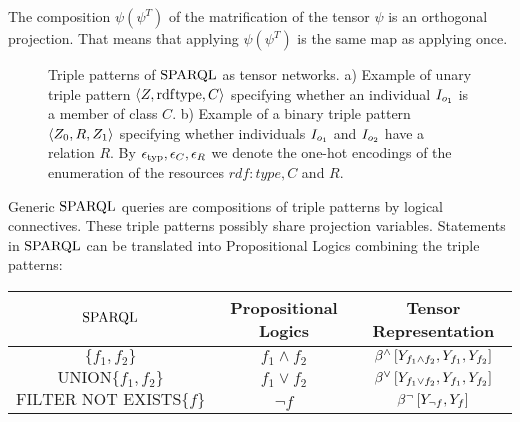 The composition $\psi (\psi^T)$ of the matrification of the tensor $\psi$ is an orthogonal projection.
That means that applying $\psi (\psi^T)$ is the same map as applying once.


\begin{figure}[h]
    \begin{center}
        
    \end{center}
    \caption{Triple patterns of $\mathrm{SPARQL}$ as tensor networks.
    a) Example of unary triple pattern $\braket{Z,\mathrm{rdf}\mathrm{type},C}$ specifying whether an individual $I_{o_{1}}$ is a member of class $C$.
        b) Example of a binary triple pattern $\braket{Z_{0},R,Z_{1}}$ specifying whether individuals $I_{o_{1}}$ and $I_{o_{2}}$ have a relation $R$.
        By $\epsilon_{\mathrm{typ}},\epsilon_{C},\epsilon_{R}$ we denote the one-hot encodings of the enumeration of the resources $rdf:type, C$ and $R$.
    }
    \label{fig:triplePatterns}
\end{figure}





Generic $\mathrm{SPARQL}$ queries are compositions of triple patterns by logical connectives. %
These triple patterns possibly share projection variables.
Statements in $\mathrm{SPARQL}$ can be translated into Propositional Logics combining the triple patterns:
\begin{center}
    \begin{tabular}{|c|c|c|}
        \hline
        \textbf{$\mathrm{SPARQL}$}                & \textbf{Propositional Logics} & \textbf{Tensor Representation}                                                                   \\
        \hline
        $\{f_1, f_2\}$                    & $f_1\land f_2$                & $\beta^{\land}\left[Y_{f_1\land f_2},Y_{f_1},Y_{f_2}\right]$ \\
        \hline
        $\mathrm{UNION}\{f_1, f_2\} $     & $f_1\lor f_2$                 & $\beta^{\lor}\left[Y_{f_1\lor f_2},Y_{f_1},Y_{f_2}\right]$   \\
        \hline
        $\mathrm{FILTER}\,\,\mathrm{NOT}\,\,\mathrm{EXISTS}\{f\}$ & $\lnot f$                     & $\beta^{\lnot}\left[Y_{\lnot f},Y_{f}\right]$                             \\
        \hline
    \end{tabular}
\end{center}

